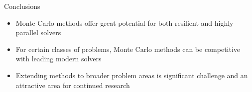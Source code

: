 \documentclass{beamer}
\begin{document}
\begin{frame}{Conclusions}
  \begin{itemize}
    \item Monte Carlo methods offer great potential for both resilient and
      highly parallel solvers
    \vfill
    \item For certain classes of problems, Monte Carlo methods can be
      competitive with leading modern solvers
    \vfill
    \item Extending methods to broader problem areas is significant challenge
      and an attractive area for continued research
  \end{itemize}
\end{frame}

\end{document}
